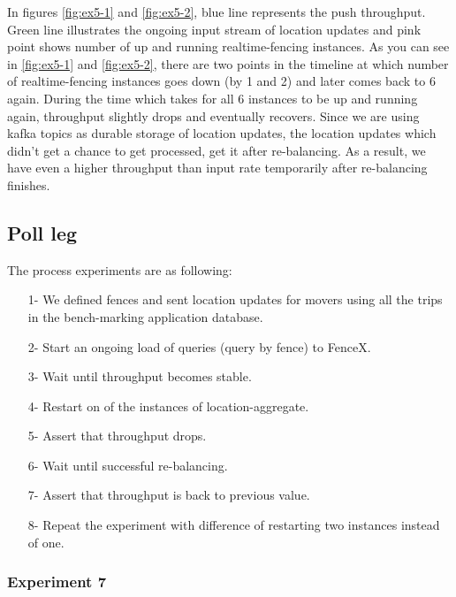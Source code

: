 \documentclass[a4]{report}
\begin{document}
        In figures \ref{fig:ex5-1} and \ref{fig:ex5-2}, blue line represents the push throughput.
        Green line illustrates the ongoing input stream of location updates and pink point shows
        number of up and running realtime-fencing instances.
        As you can see in \ref{fig:ex5-1} and \ref{fig:ex5-2}, there are two points in the timeline at which number of
        realtime-fencing
        instances goes down (by 1 and 2) and later comes back to 6 again.
        During the time which takes for all 6 instances to be up and running again, throughput slightly drops and
        eventually recovers.
        Since we are using kafka topics as durable storage of location updates, the location updates which
        didn't get a chance to get processed, get it after re-balancing.
        As a result, we have even a higher throughput than input rate temporarily after re-balancing finishes.

        \subsection{Poll leg}
        The process experiments are as following:
        \begin{itemize}
            \item[1-] We defined fences and sent location updates for movers using all the trips in the bench-marking
            application database.
            \item[2-] Start an ongoing load of queries (query by fence) to FenceX.
            \item[3-] Wait until throughput becomes stable.
            \item[4-] Restart on of the instances of location-aggregate.
            \item[5-] Assert that throughput drops.
            \item[6-] Wait until successful re-balancing.
            \item[7-] Assert that throughput is back to previous value.
            \item[8-] Repeat the experiment with difference of restarting two instances instead of one.
        \end{itemize}

        \subsubsection{Experiment 7}
\end{document}
